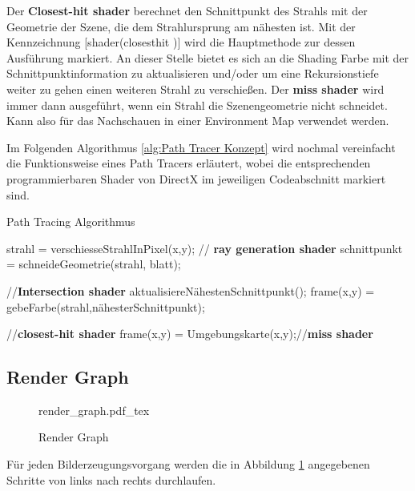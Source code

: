Der \textbf{Closest-hit shader} berechnet den Schnittpunkt des Strahls mit der Geometrie
der Szene, die dem Strahlursprung am nähesten ist.
Mit der Kennzeichnung [shader(\dq closesthit \dq)] wird die Hauptmethode zur 
dessen Ausführung markiert. An dieser Stelle bietet es sich an die Shading Farbe 
mit der Schnittpunktinformation zu aktualisieren und/oder um eine Rekursionstiefe weiter 
zu gehen einen weiteren Strahl zu verschießen. 
Der \textbf{miss shader} wird immer dann ausgeführt, wenn ein Strahl die
Szenengeometrie nicht schneidet. Kann also für das Nachschauen in einer 
Environment Map verwendet werden. 

Im Folgenden Algorithmus \ref{alg:Path Tracer Konzept} wird nochmal vereinfacht die Funktionsweise 
eines Path Tracers erläutert, wobei die entsprechenden programmierbaren Shader von DirectX 
im jeweiligen Codeabschnitt markiert sind.

\begin{tcolorbox}
\begin{algorithm}[H]
    \caption{Path Tracing Algorithmus}
    \begin{algorithmic}[1]
        \State strahl = verschiesseStrahlInPixel(x,y); // \textbf{ray generation shader}
        \State schnittpunkt = schneideGeometrie(strahl, blatt);\par
        //\textbf{Intersection shader}
        \State aktualisiereNähestenSchnittpunkt();
        \EndIf
        \EndFor
        \State frame(x,y) = gebeFarbe(strahl,nähesterSchnittpunkt);\par
        //\textbf{closest-hit shader}
        \Else
        \State frame(x,y) = Umgebungskarte(x,y);//\textbf{miss shader}
        \EndIf
        \EndFor
        \EndProcedure
    \end{algorithmic}
    \label{alg:Path Tracer Konzept}
\end{algorithm}
\end{tcolorbox}

\subsection{Render Graph}

\begin{figure}[H]
    \begin{tcolorbox}
    \centering
    \def\svgwidth{\columnwidth}
    {render_graph.pdf_tex}
    \end{tcolorbox}
    \caption{Render Graph}
    \label{pic:Render Graph}
\end{figure}

Für jeden Bilderzeugungsvorgang werden die in Abbildung \ref{pic:Render Graph} angegebenen Schritte von links nach rechts 
durchlaufen.








